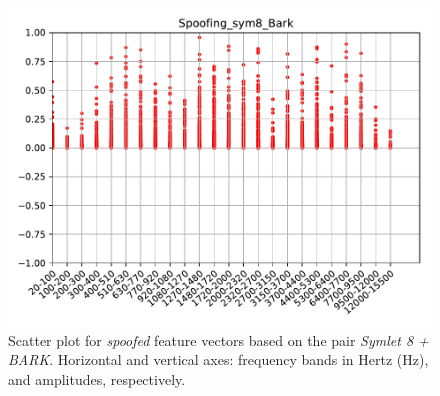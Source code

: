 		\begin{figure}[H]
			\centering
			\includegraphics[scale=.7]{images/results/barkVersusMel/Spoofing_sym8_Bark.pdf}
			\caption{Scatter plot for \textit{spoofed} feature vectors based on the pair \textit{Symlet 8 + BARK}. Horizontal and vertical axes: frequency bands in Hertz (Hz), and amplitudes, respectively.}
			\label{fig:spoofingsym8bark}
		\end{figure}
	




